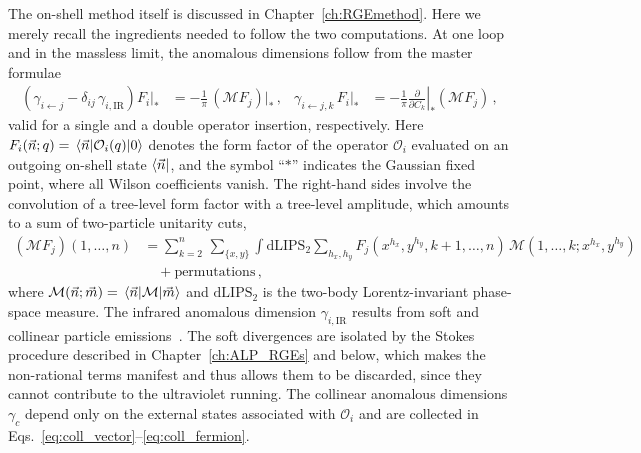 The on-shell method itself is discussed in Chapter~\ref{ch:RGEmethod}. Here we merely recall
the ingredients needed to follow the two computations.
At one loop and in the massless limit, the anomalous dimensions follow from the master
formulae
\begin{align}
    \left(\gamma_{i\leftarrow j}-\delta_{ij}\,\gamma_{i,\text{IR}}\right) F_i\big|_*
    &= -\frac{1}{\pi}\,(\mathcal M F_j)\big|_*\,,
    &
    \gamma_{i\leftarrow j,k}\,F_i\big|_*
    &= -\frac{1}{\pi}\left.\frac{\partial}{\partial C_k}\right|_*(\mathcal M F_j)\,,
    \label{eq:masterformula}
\end{align}
valid for a single and a double operator insertion, respectively.
Here $F_i(\vec n;q) = \mel{\vec n}{\mathcal O_i(q)}{0}$ denotes the form factor of the operator
$\mathcal O_i$ evaluated on an outgoing on-shell state $\bra{\vec n}$, and the symbol ``$*$''
indicates the Gaussian fixed point, where all Wilson coefficients vanish.
The right-hand sides involve the convolution of a tree-level form factor with a tree-level
amplitude, which amounts to a sum of two-particle unitarity cuts,
\begin{align}
    (\mathcal M F_j)(1,\dotsc,n) &=
    \sum_{k=2}^{n}\,\sum_{\{x,y\}} \int \text{dLIPS}_2 \sum_{h_x,h_y}
    F_j(x^{h_x},y^{h_y},k+1,\dotsc,n)\,
    \mathcal M(1,\dotsc,k;x^{h_x},y^{h_y})\nonumber \\
    &\quad + \text{permutations}\,,
    \label{eq:cutconvolution}
\end{align}
where $\mathcal M(\vec n;\vec m) = \mel{\vec n}{\mathcal M}{\vec m}$ and $\text{dLIPS}_2$ is
the two-body Lorentz-invariant phase-space measure.
The infrared anomalous dimension $\gamma_{i,\text{IR}}$ results from soft and collinear particle emissions~\cite{Sterman:2002qn,Becher:2009cu,Chiu:2009mg}.
The soft divergences are isolated by the Stokes procedure \cite{Mastrolia:2009dr} described in Chapter~\ref{ch:ALP_RGEs} and below, which makes the
non-rational terms manifest and thus allows them to be discarded, since they cannot
contribute to the ultraviolet running.
The collinear anomalous dimensions $\gamma_c$ depend only on the external states associated
with $\mathcal O_i$ and are collected in Eqs.~\eqref{eq:coll_vector}--\eqref{eq:coll_fermion}.

